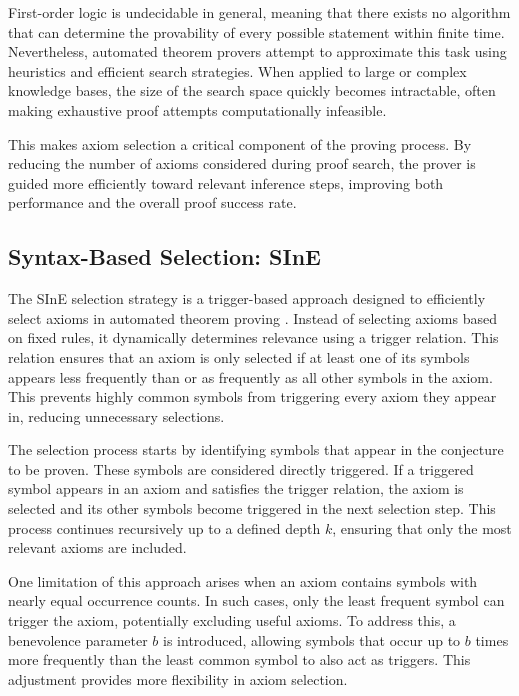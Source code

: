 \documentclass[english,version-2020-11]{uzl-thesis}
\begin{document}
First-order logic is undecidable in general, meaning that there exists no algorithm that can determine the provability of every possible statement within finite time. Nevertheless, automated theorem provers attempt to approximate this task using heuristics and efficient search strategies. When applied to large or complex knowledge bases, the size of the search space quickly becomes intractable, often making exhaustive proof attempts computationally infeasible.

This makes axiom selection a critical component of the proving process. By reducing the number of axioms considered during proof search, the prover is guided more efficiently toward relevant inference steps, improving both performance and the overall proof success rate.


\subsection{Syntax-Based Selection: SInE}

The SInE selection strategy is a trigger-based approach designed to efficiently select axioms in automated theorem proving \cite{Hoder2011}. Instead of selecting axioms based on fixed rules, it dynamically determines relevance using a trigger relation. This relation ensures that an axiom is only selected if at least one of its symbols appears less frequently than or as frequently as all other symbols in the axiom. This prevents highly common symbols from triggering every axiom they appear in, reducing unnecessary selections.

The selection process starts by identifying symbols that appear in the conjecture to be proven. These symbols are considered directly triggered. If a triggered symbol appears in an axiom and satisfies the trigger relation, the axiom is selected and its other symbols become triggered in the next selection step. This process continues recursively up to a defined depth \( k \), ensuring that only the most relevant axioms are included.

One limitation of this approach arises when an axiom contains symbols with nearly equal occurrence counts. In such cases, only the least frequent symbol can trigger the axiom, potentially excluding useful axioms. To address this, a benevolence parameter \( b \) is introduced, allowing symbols that occur up to \( b \) times more frequently than the least common symbol to also act as triggers. This adjustment provides more flexibility in axiom selection.
\end{document}
